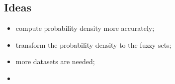 \documentclass[a4paper]{IEEEtran}
\begin{document}
\subsection{Ideas}
\begin{itemize}
	\item compute probability density more accurately;
	\item transform the probability density to the fuzzy sets;
	\item more datasets are needed;
	\item 
\end{itemize}


\end{document}
